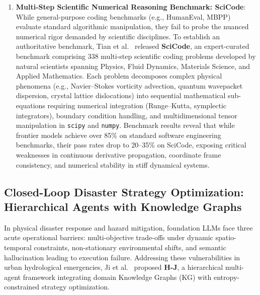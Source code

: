 \begin{enumerate}
    \item \textbf{Multi-Step Scientific Numerical Reasoning Benchmark: SciCode}: While general-purpose coding benchmarks (e.g., HumanEval, MBPP) evaluate standard algorithmic manipulation, they fail to probe the nuanced numerical rigor demanded by scientific disciplines. To establish an authoritative benchmark, Tian et al.~\cite{tian2024scicode} released \textbf{SciCode}, an expert-curated benchmark comprising 338 multi-step scientific coding problems developed by natural scientists spanning Physics, Fluid Dynamics, Materials Science, and Applied Mathematics. Each problem decomposes complex physical phenomena (e.g., Navier--Stokes vorticity advection, quantum wavepacket dispersion, crystal lattice dislocations) into sequential mathematical sub-equations requiring numerical integration (Runge--Kutta, symplectic integrators), boundary condition handling, and multidimensional tensor manipulation in \texttt{scipy} and \texttt{numpy}. Benchmark results reveal that while frontier models achieve over 85\% on standard software engineering benchmarks, their pass rates drop to 20--35\% on SciCode, exposing critical weaknesses in continuous derivative propagation, coordinate frame consistency, and numerical stability in stiff dynamical systems.
\end{enumerate}

\subsection{Closed-Loop Disaster Strategy Optimization: Hierarchical Agents with Knowledge Graphs}
\label{sec:hierarchical_disaster_agents}
In physical disaster response and hazard mitigation, foundation LLMs face three acute operational barriers: multi-objective trade-offs under dynamic spatio-temporal constraints, non-stationary environmental shifts, and semantic hallucination leading to execution failure. Addressing these vulnerabilities in urban hydrological emergencies, Ji et al.~\cite{ji2025entropy} proposed \textbf{H-J}, a hierarchical multi-agent framework integrating domain Knowledge Graphs (KG) with entropy-constrained strategy optimization.

